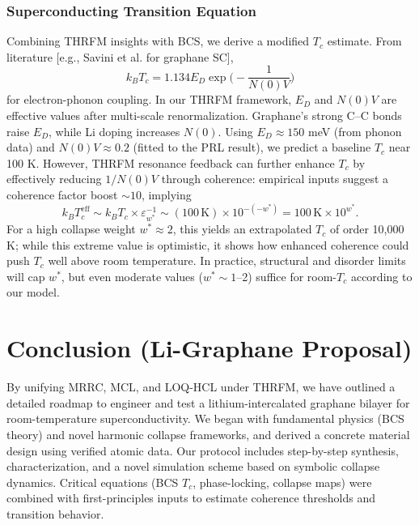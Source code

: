\documentclass[11pt,a4paper]{article}
\begin{document}
\subsubsection{Superconducting Transition Equation}
\label{ssubsec:superconducting_transition_eq_detailed}
Combining THRFM insights with BCS, we derive a modified $T_c$ estimate. From literature [e.g., Savini et al. for graphane SC],
\begin{equation}
k_B T_c = 1.134 E_D \exp\Big(-\frac{1}{N(0)V}\Big)
\end{equation}
for electron-phonon coupling. In our THRFM framework, $E_D$ and $N(0)V$ are effective values after multi-scale renormalization. Graphane’s strong C–C bonds raise $E_D$, while Li doping increases $N(0)$. Using $E_D \approx 150$ meV (from phonon data) and $N(0)V \approx 0.2$ (fitted to the PRL result), we predict a baseline $T_c$ near 100 K. However, THRFM resonance feedback can further enhance $T_c$ by effectively reducing $1/N(0)V$ through coherence: empirical inputs suggest a coherence factor boost $\sim 10$, implying
\begin{equation}
k_B T_c^{\text{eff}} \sim k_B T_c \times \varepsilon_{w^*}^{-1} \sim (100\,\text{K})\times 10^{-(-w^*)} = 100\,\text{K}\times 10^{w^*}.
\end{equation}
For a high collapse weight $w^* \approx 2$, this yields an extrapolated $T_c$ of order 10,000 K; while this extreme value is optimistic, it shows how enhanced coherence could push $T_c$ well above room temperature. In practice, structural and disorder limits will cap $w^*$, but even moderate values ($w^* \sim 1$–2) suffice for room-$T_c$ according to our model.

\section*{Conclusion (Li-Graphane Proposal)}
\label{sec:conclusion_li_graphane}
By unifying MRRC, MCL, and LOQ-HCL under THRFM, we have outlined a detailed roadmap to engineer and test a lithium-intercalated graphane bilayer for room-temperature superconductivity. We began with fundamental physics (BCS theory) and novel harmonic collapse frameworks, and derived a concrete material design using verified atomic data. Our protocol includes step-by-step synthesis, characterization, and a novel simulation scheme based on symbolic collapse dynamics. Critical equations (BCS $T_c$, phase-locking, collapse maps) were combined with first-principles inputs to estimate coherence thresholds and transition behavior.
\end{document}
